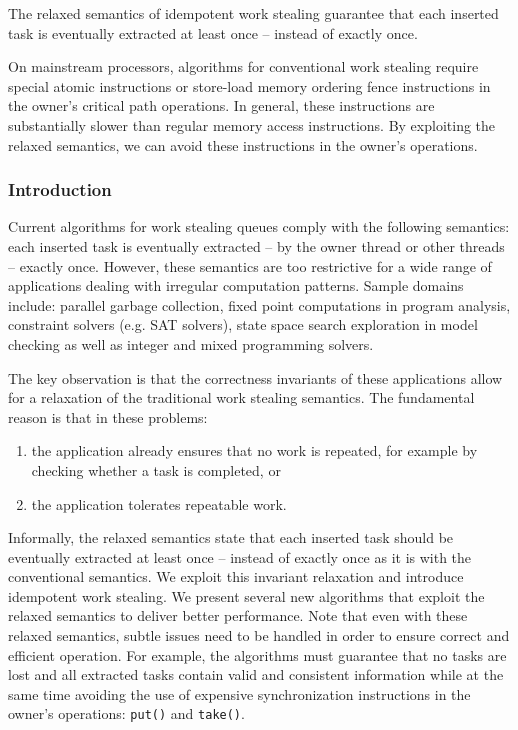 The relaxed semantics of idempotent work stealing guarantee that each
inserted task is eventually extracted at least once -- instead of
exactly once.

On mainstream processors, algorithms for conventional work stealing
require special atomic instructions or store-load memory ordering
fence instructions in the owner's critical path operations. In
general, these instructions are substantially slower than regular
memory access instructions. By exploiting the relaxed semantics, we
can avoid these instructions in the owner's operations.

\subsubsection{Introduction}

Current algorithms for work stealing queues comply with the following
semantics: each inserted task is eventually extracted -- by the owner
thread or other threads -- exactly once. However, these semantics are
too restrictive for a wide range of applications dealing with
irregular computation patterns. Sample domains include: parallel
garbage collection, fixed point computations in program analysis,
constraint solvers (e.g. SAT solvers), state space search exploration
in model checking as well as integer and mixed programming solvers.

The key observation is that the correctness invariants of these
applications allow for a relaxation of the traditional work stealing
semantics. The fundamental reason is that in these problems:

\begin{enumerate}
\item the application already ensures that no work is repeated, for
  example by checking whether a task is completed, or
\item the application tolerates repeatable work.
\end{enumerate}

Informally, the relaxed semantics state that each inserted task should
be eventually extracted at least once -- instead of exactly once as it
is with the conventional semantics. We exploit this invariant
relaxation and introduce idempotent work stealing. We present several
new algorithms that exploit the relaxed semantics to deliver better
performance. Note that even with these relaxed semantics, subtle
issues need to be handled in order to ensure correct and efficient
operation. For example, the algorithms must guarantee that no tasks
are lost and all extracted tasks contain valid and consistent
information while at the same time avoiding the use of expensive
synchronization instructions in the owner's operations:
\lstinline!put()! and \lstinline!take()!.


